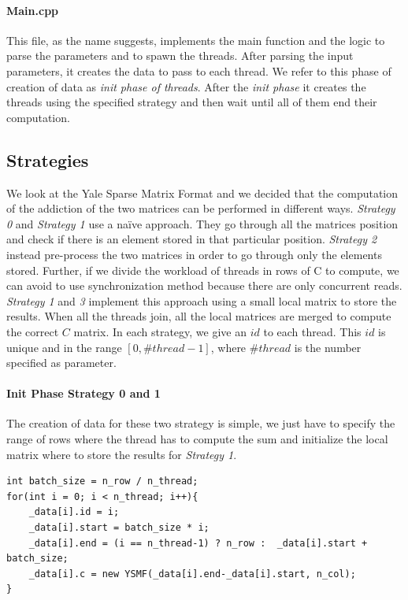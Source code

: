 \documentclass[]{article}
\begin{document}
\newpage
\label{Main}
\paragraph{Main.cpp}
This file, as the name suggests, implements the main function and the logic to parse the parameters and to spawn the threads.
After parsing the input parameters, it creates the data to pass to each thread. We refer to this phase of creation of data as \textit{init phase of threads}. After the \textit{init phase} it creates the threads using the specified strategy and then wait until all of them end their computation.




\label{strategy}
\subsection{Strategies}
We look at the Yale Sparse Matrix Format and we decided that the computation of the addiction of the two matrices can be performed in different ways. 
\textit{Strategy 0} and \textit{Strategy 1} use a na\"ive approach.
They go through all the matrices position and check if there is an element stored in that particular position.
\textit{Strategy 2} instead pre-process the two matrices in order to go through only the elements stored.
Further, if we divide the workload of  threads in rows of C to compute, we can avoid to use synchronization method because there are only concurrent reads. \textit{Strategy 1} and \textit{3} implement this approach using a small local matrix to store the results. When all the threads join, all the local matrices are merged to compute the correct $C$ matrix.
In each strategy, we give an $id$ to each thread. This $id$ is unique and in the range $[0, \#thread-1]$, where $\#thread$ is the number specified as parameter.

\paragraph{Init Phase Strategy 0 and 1}
The creation of data for these two strategy is simple, we just have to specify the range of rows where the thread has to compute the sum and initialize the local matrix where to store the results for \textit{Strategy 1}.
\begin{lstlisting}[style=customc]
int batch_size = n_row / n_thread;
for(int i = 0; i < n_thread; i++){
    _data[i].id = i;
    _data[i].start = batch_size * i;
    _data[i].end = (i == n_thread-1) ? n_row :  _data[i].start + batch_size;
    _data[i].c = new YSMF(_data[i].end-_data[i].start, n_col);
}
\end{lstlisting}
\end{document}
